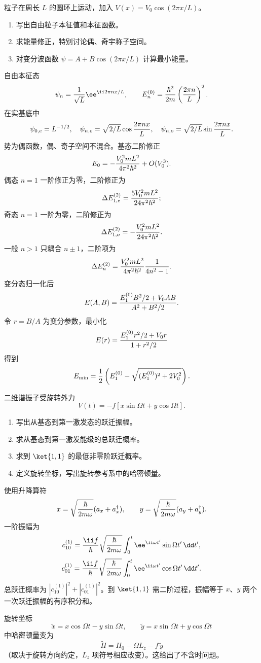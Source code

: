 
\begin{question}
粒子在周长 $L$ 的圆环上运动，加入 $V(x)=V_0\cos(2\pi x/L)$。
\begin{enumerate}
  \item 写出自由粒子本征值和本征函数。
  \item 求能量修正，特别讨论偶、奇宇称子空间。
  \item 对变分波函数 $\psi=A+B\cos(2\pi x/L)$ 计算最小能量。
\end{enumerate}
\begin{solution}
自由本征态
\[
  \psi_n={1\over\sqrt L}\ee^{\ii2\pi nx/L},\qquad
  E_n^{(0)}={\hbar^2\over2m}\left({2\pi n\over L}\right)^2.
\]
在实基底中
\[
  \psi_{0,e}=L^{-1/2},\quad
  \psi_{n,e}=\sqrt{2/L}\cos{2\pi nx\over L},\quad
  \psi_{n,o}=\sqrt{2/L}\sin{2\pi nx\over L}.
\]
势为偶函数，偶、奇子空间不混合。基态二阶修正
\[
  E_0=-{V_0^2mL^2\over4\pi^2\hbar^2}+O(V_0^3).
\]
偶态 $n=1$ 一阶修正为零，二阶修正为
\[
  \Delta E_{1,e}^{(2)}={5V_0^2mL^2\over24\pi^2\hbar^2};
\]
奇态 $n=1$ 一阶为零，二阶修正为
\[
  \Delta E_{1,o}^{(2)}=-{V_0^2mL^2\over24\pi^2\hbar^2}.
\]
一般 $n>1$ 只耦合 $n\pm1$，二阶项为
\[
  \Delta E_n^{(2)}={V_0^2mL^2\over4\pi^2\hbar^2}{1\over4n^2-1}.
\]
变分态归一化后
\[
  E(A,B)={E_1^{(0)}B^2/2+V_0AB\over A^2+ B^2/2}.
\]
令 $r=B/A$ 为变分参数，最小化
\[
  E(r)={E_1^{(0)}r^2/2+V_0r\over1+r^2/2}
\]
得到
\[
  E_{\min}={1\over2}\left(E_1^{(0)}-\sqrt{(E_1^{(0)})^2+2V_0^2}\right).
\]
\end{solution}
\end{question}

\begin{question}
二维谐振子受旋转外力
\[
  V(t)=-f[x\sin\Omega t+y\cos\Omega t].
\]
\begin{enumerate}
  \item 写出从基态到第一激发态的跃迁振幅。
  \item 求从基态到第一激发能级的总跃迁概率。
  \item 求到 $\ket{1,1}$ 的最低非零阶跃迁概率。
  \item 定义旋转坐标，写出旋转参考系中的哈密顿量。
\end{enumerate}
\begin{solution}
使用升降算符
\[
  x=\sqrt{\hbar\over2m\omega}(a_x+a_x^\dagger),\qquad
  y=\sqrt{\hbar\over2m\omega}(a_y+a_y^\dagger).
\]
一阶振幅为
\[
  c_{10}^{(1)}={\ii f\over\hbar}\sqrt{\hbar\over2m\omega}
  \int_0^t\ee^{\ii\omega t'}\sin\Omega t'\,\dd t',
\]
\[
  c_{01}^{(1)}={\ii f\over\hbar}\sqrt{\hbar\over2m\omega}
  \int_0^t\ee^{\ii\omega t'}\cos\Omega t'\,\dd t' .
\]
总跃迁概率为 $|c_{10}^{(1)}|^2+|c_{01}^{(1)}|^2$。到 $\ket{1,1}$ 需二阶过程，振幅等于 $x$、$y$ 两个一次跃迁振幅的有序积分和。

旋转坐标
\[
  \tilde x=x\cos\Omega t-y\sin\Omega t,\qquad
  \tilde y=x\sin\Omega t+y\cos\Omega t
\]
中哈密顿量变为
\[
  \tilde H=H_0-\Omega L_z-f\,\tilde y
\]
（取决于旋转方向约定，$L_z$ 项符号相应改变）。这给出了不含时问题。
\end{solution}
\end{question}

